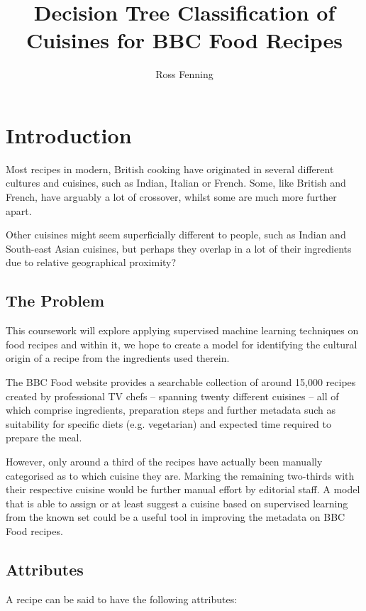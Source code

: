 \documentclass[11pt,a4paper]{article}
\title{Decision Tree Classification of Cuisines for BBC Food Recipes}
\author{Ross Fenning}
\begin{document}
\maketitle

\section{Introduction}

Most recipes in modern, British cooking have
originated in several different cultures and cuisines, such as Indian,
Italian or French. Some, like British and French, have arguably a lot
of crossover, whilst some are much more further apart.

Other cuisines might seem superficially different to people, such as Indian and
South-east Asian cuisines, but perhaps they overlap in a lot of their
ingredients due to relative geographical proximity?


\subsection{The Problem}

This coursework will explore applying supervised machine learning
techniques on food recipes and within it, we hope to create a model for
identifying the cultural origin of a recipe from the ingredients used
therein.

The BBC Food website provides a searchable collection of around 15,000
recipes created by professional TV chefs -- spanning twenty different
cuisines -- all of which comprise ingredients, preparation steps and
further metadata such as suitability for specific diets (e.g.
vegetarian) and expected time required to prepare the meal.

However, only around a third of the recipes have actually been manually
categorised as to which cuisine they are. Marking the remaining
two-thirds with their respective cuisine would be further manual effort
by editorial staff. A model that is able to assign or at least suggest
a cuisine based on supervised learning from the known set could be a useful
tool in improving the metadata on BBC Food recipes.

\subsection{Attributes}

A recipe can be said to have the following attributes:
\end{document}

